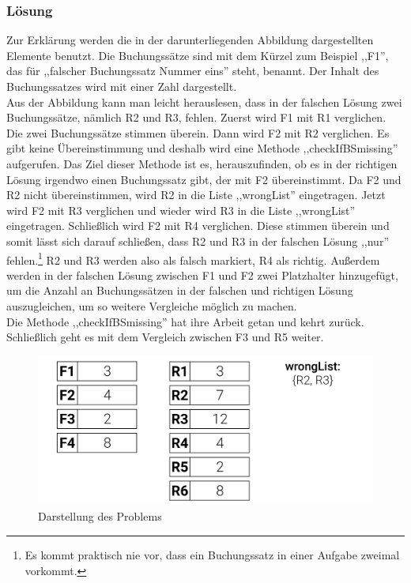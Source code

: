 \documentclass[12pt]{report}
\begin{document}
\subsubsection{Lösung}
Zur Erklärung werden die in der darunterliegenden Abbildung dargestellten Elemente benutzt. Die Buchungssätze sind mit dem Kürzel zum Beispiel ,,F1'', das für ,,falscher Buchungssatz Nummer eins'' steht, benannt. Der Inhalt des Buchungssatzes wird mit einer Zahl dargestellt.\\
Aus der Abbildung kann man leicht herauslesen, dass in der falschen Lösung zwei Buchungssätze, nämlich R2 und R3, fehlen. Zuerst wird F1 mit R1 verglichen. Die zwei Buchungssätze stimmen überein. Dann wird F2 mit R2 verglichen. Es gibt keine Übereinstimmung und deshalb wird eine Methode ,,checkIfBSmissing'' aufgerufen. Das Ziel dieser Methode ist es, herauszufinden, ob es in der richtigen Lösung irgendwo einen Buchungssatz gibt, der mit F2 übereinstimmt. Da F2 und R2 nicht übereinstimmen, wird R2 in die Liste ,,wrongList'' eingetragen. Jetzt wird F2 mit R3 verglichen und wieder wird R3 in die Liste ,,wrongList'' eingetragen. Schließlich wird F2 mit R4 verglichen. Diese stimmen überein und somit lässt sich darauf schließen, dass R2 und R3 in der falschen Lösung ,,nur'' fehlen.\footnote{Es kommt praktisch nie vor, dass ein Buchungssatz in einer Aufgabe zweimal vorkommt.} R2 und R3 werden also als falsch markiert, R4 als richtig. Außerdem werden in der falschen Lösung zwischen F1 und F2 zwei Platzhalter hinzugefügt, um die Anzahl an Buchungssätzen in der falschen und richtigen Lösung auszugleichen, um so weitere Vergleiche möglich zu machen.\\Die Methode ,,checkIfBSmissing'' hat ihre Arbeit getan und kehrt zurück. Schließlich geht es mit dem Vergleich zwischen F3 und R5 weiter.

\begin{figure}[h]
	\centering
	\includegraphics[height=5cm]{images/missingBS}
	\caption[Problem fehlende Buchungssätze]{Darstellung des Problems}
\end{figure}
  
\end{document}
